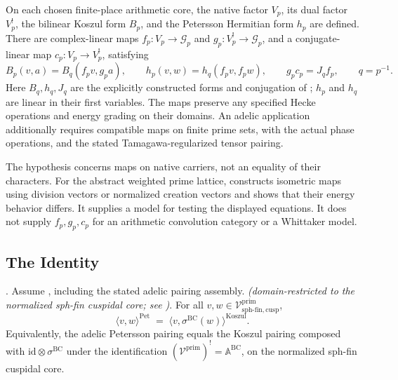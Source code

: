 \begin{hypothesis}
\label{v4-arith:kp:hyp:native-pairing-maps}
On each chosen finite-place arithmetic core, the native factor
$V_p$, its dual factor $V_p^!$, the bilinear Koszul form $B_p$,
and the Petersson Hermitian form $h_p$ are defined. There are
complex-linear maps $f_p:V_p\to\mathscr G_p$ and
$g_p:V_p^!\to\mathscr G_p$, and a conjugate-linear map
$c_p:V_p\to V_p^!$, satisfying
\[
 B_p(v,a)=B_q(f_pv,g_pa),\qquad
 h_p(v,w)=h_q(f_pv,f_pw),\qquad
 g_pc_p=J_qf_p,
 \qquad q=p^{-1}.
\]
Here $B_q,h_q,J_q$ are the explicitly constructed forms and
conjugation of ; $h_p$
and $h_q$ are linear in their first variables. The maps preserve
any specified Hecke operations and energy grading on their
domains. An adelic application additionally requires compatible
maps on finite prime sets, with the actual phase operations,
and the stated Tamagawa-regularized tensor pairing.
\end{hypothesis}

The hypothesis concerns maps on native carriers, not an equality
of their characters. For the abstract weighted prime lattice,
 constructs isometric maps
using division vectors or normalized creation vectors and shows
that their energy behavior differs. It supplies a model for
testing the displayed equations. It does not supply $f_p,g_p,c_p$
for an arithmetic convolution category or a Whittaker model.

\subsection{The Identity}
\label{v4-arith:kp:identity}

\begin{theorem}
\label{v4-arith:kp:thm:main}
\ClaimStatusProvedHereConditional. Assume , including the stated adelic pairing assembly.  \emph{(domain-restricted to the normalized
sph-fin cuspidal core; see
)}. For all
\(v,w\in\mathcal{V}^{\mathrm{prim}}_{\mathrm{sph\text{-}fin,cusp}}\),
\begin{equation}
\label{v4-arith:kp:eq:main}
\langle v,w\rangle^{\mathrm{Pet}}
\;=\;
\langle v,\sigma^{\mathrm{BC}}(w)\rangle^{\mathrm{Koszul}}.
\end{equation}
Equivalently, the adelic Petersson pairing equals the Koszul
pairing composed with \(\mathrm{id}\otimes\sigma^{\mathrm{BC}}\)
under the identification
\((\mathcal{V}^{\mathrm{prim}})^{!}=\mathbb{A}^{\mathrm{BC}}\), on the
normalized sph-fin cuspidal core.
\end{theorem}

